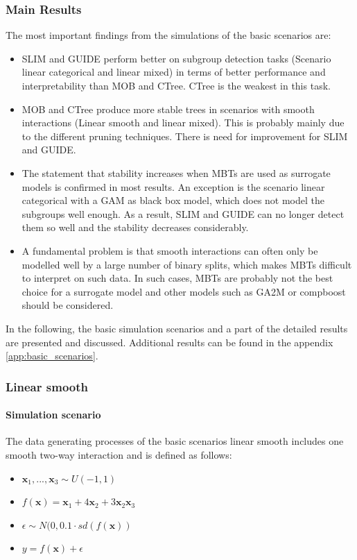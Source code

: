 \subsubsection{Main Results}
The most important findings from the simulations of the basic scenarios are:
\begin{itemize}
    \item SLIM and GUIDE perform better on subgroup detection tasks (Scenario linear categorical and linear mixed) in terms of better performance and interpretability than MOB and CTree. CTree is the weakest in this task.
    \item MOB and CTree produce more stable trees in scenarios with smooth interactions (Linear smooth and linear mixed). This is probably mainly due to the different pruning techniques. There is need for improvement for SLIM and GUIDE.
    \item The statement that stability increases when MBTs are used as surrogate models is confirmed in most results. An exception is the scenario linear categorical with a GAM as black box model, which does not model the subgroups well enough. As a result, SLIM and GUIDE can no longer detect them so well and the stability decreases considerably.
    \item A fundamental problem is that smooth interactions can often only be modelled well by a large number of binary splits, which makes MBTs difficult to interpret on such data. In such cases, MBTs are probably not the best choice for a surrogate model and other models such as GA2M \citep{Lou.2013} or compboost \citep{Schalk.2018} should be considered.

\end{itemize}

In the following, the basic simulation scenarios and a part of the detailed  results are presented and discussed. Additional results can be found in the appendix \ref{app:basic_scenarios}.
\subsubsection{Linear smooth} 

\paragraph{Simulation scenario}
The data generating processes of the basic scenarios linear smooth includes one smooth two-way interaction and is defined as follows:

\begin{itemize}
    \item $\textbf{x}_1,..., \textbf{x}_{3} \sim U(-1,1)$
    \item $ f(\textbf{x}) = \textbf{x}_1 + 4   \textbf{x}_2 + 3   \textbf{x}_2   \textbf{x}_3 $
    \item $\epsilon \sim N(0, 0.1 \cdot sd(f(\textbf{x}))$
    \item $y = f(\textbf{x}) + \epsilon$
\end{itemize}    

